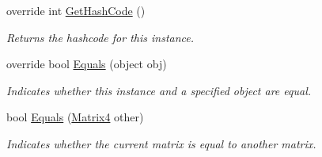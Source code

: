 \begin{DoxyCompactItemize}
override int \hyperlink{struct_open_t_k_1_1_matrix4_a860f4a26f8d6e4995d2d95600a575ccd}{Get\-Hash\-Code} ()
\begin{DoxyCompactList}\small\item\em Returns the hashcode for this instance. \end{DoxyCompactList}\item 
override bool \hyperlink{struct_open_t_k_1_1_matrix4_ab1c8b1f7324f8d14a29c343502b5b38c}{Equals} (object obj)
\begin{DoxyCompactList}\small\item\em Indicates whether this instance and a specified object are equal. \end{DoxyCompactList}\item 
bool \hyperlink{struct_open_t_k_1_1_matrix4_aae83514ae5997a0917eaa72bb36f5c2c}{Equals} (\hyperlink{struct_open_t_k_1_1_matrix4}{Matrix4} other)
\begin{DoxyCompactList}\small\item\em Indicates whether the current matrix is equal to another matrix.\end{DoxyCompactList}\end{DoxyCompactItemize}
